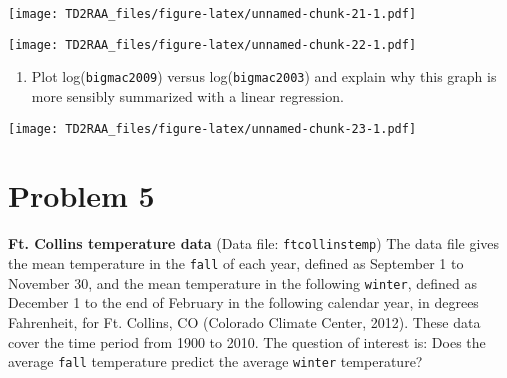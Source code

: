 \documentclass[
]{article}
\newenvironment{Shaded}{\begin{snugshade}}{\end{snugshade}}
\newcommand{\FunctionTok}[1]{\textcolor[rgb]{0.00,0.00,0.00}{#1}}
\newcommand{\NormalTok}[1]{#1}
\newcommand{\SpecialCharTok}[1]{\textcolor[rgb]{0.00,0.00,0.00}{#1}}
\providecommand{\tightlist}{%
  \setlength{\itemsep}{0pt}\setlength{\parskip}{0pt}}
\begin{document}
\texttt{[image: TD2RAA\_files/figure-latex/unnamed-chunk-21-1.pdf]}

\begin{Shaded}
\end{Shaded}

\texttt{[image: TD2RAA\_files/figure-latex/unnamed-chunk-22-1.pdf]}

\begin{enumerate}
\def\labelenumi{\alph{enumi}.}
\setcounter{enumi}{2}
\tightlist
\item
  Plot log(\texttt{bigmac2009}) versus log(\texttt{bigmac2003}) and
  explain why this graph is more sensibly summarized with a linear
  regression.
\end{enumerate}

\begin{Shaded}
\end{Shaded}

\texttt{[image: TD2RAA\_files/figure-latex/unnamed-chunk-23-1.pdf]}

\hypertarget{problem-5}{%
\section{Problem 5}\label{problem-5}}

\textbf{Ft. Collins temperature data} (Data file:
\texttt{ftcollinstemp}) The data file gives the mean temperature in the
\texttt{fall} of each year, defined as September 1 to November 30, and
the mean temperature in the following \texttt{winter}, defined as
December 1 to the end of February in the following calendar year, in
degrees Fahrenheit, for Ft. Collins, CO (Colorado Climate Center, 2012).
These data cover the time period from 1900 to 2010. The question of
interest is: Does the average \texttt{fall} temperature predict the
average \texttt{winter} temperature?
\end{document}
